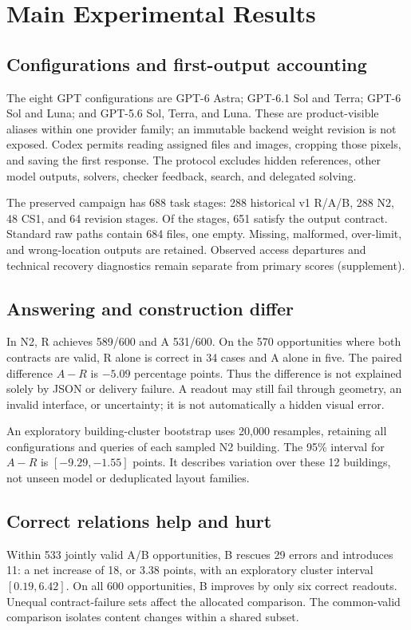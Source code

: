 \section{Main Experimental Results}
\label{sec:results}



\subsection{Configurations and first-output accounting}
The eight GPT configurations are GPT-6 Astra; GPT-6.1 Sol and Terra;
GPT-6 Sol and Luna; and GPT-5.6 Sol, Terra, and Luna.
These are product-visible aliases within one provider family; an immutable
backend weight revision is not exposed. Codex permits reading assigned
files and images, cropping those pixels, and saving the first response.
The protocol excludes hidden references, other model outputs, solvers,
checker feedback, search, and delegated solving.

The preserved campaign has 688 task stages: 288 historical v1 R/A/B,
288 N2, 48 CS1, and 64 revision stages. Of the stages, 651 satisfy
the output contract.
Standard raw paths contain 684 files, one empty. Missing, malformed,
over-limit, and wrong-location outputs are retained. Observed access
departures and technical recovery diagnostics remain separate from
primary scores (supplement).

\subsection{Answering and construction differ}
In N2, R achieves 589/600 and A 531/600.
On the 570 opportunities where both contracts are valid,
R alone is correct in 34 cases and A alone in five.
The paired difference $A-R$ is $-5.09$ percentage points.
Thus the difference is not explained solely by JSON or delivery failure.
A readout may still fail through geometry, an invalid interface, or
uncertainty; it is not automatically a hidden visual error.

An exploratory building-cluster bootstrap uses 20,000 resamples,
retaining all configurations and queries of each sampled N2 building.
The 95\% interval for $A-R$ is $[-9.29,-1.55]$ points.
It describes variation over these 12 buildings, not unseen model or
deduplicated layout families.

\subsection{Correct relations help and hurt}
Within 533 jointly valid A/B opportunities, B rescues 29 errors and
introduces 11: a net increase of 18, or 3.38 points, with an exploratory
cluster interval $[0.19,6.42]$.
On all 600 opportunities, B improves by only six correct readouts.
Unequal contract-failure sets affect the allocated comparison. The
common-valid comparison isolates content changes within a shared subset.


